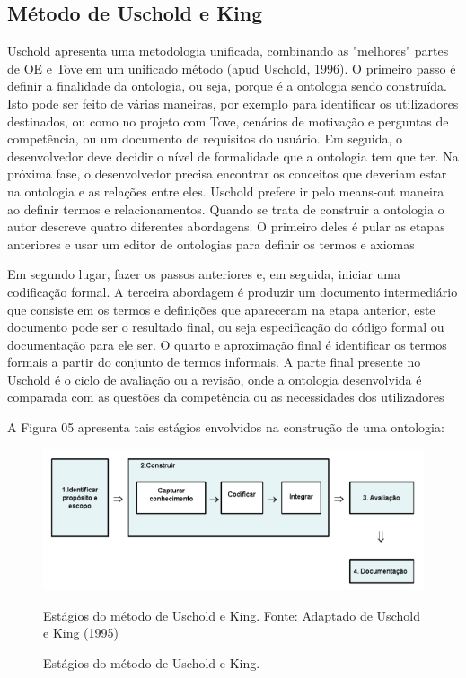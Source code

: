 \subsection{Método de Uschold e King} 
\qquad Uschold apresenta uma metodologia unificada, combinando as "melhores" partes de OE e Tove em um unificado método (apud Uschold, 1996). O primeiro passo é definir a finalidade da ontologia, ou seja, porque é a ontologia sendo construída. Isto pode ser feito de várias maneiras, por exemplo para identificar os utilizadores destinados, ou como no projeto com Tove, cenários de motivação e perguntas de competência, ou um documento de requisitos do usuário. Em seguida, o desenvolvedor deve decidir o nível de formalidade que a ontologia tem que ter. Na próxima fase, o desenvolvedor precisa encontrar os conceitos que deveriam estar na ontologia e as relações entre eles. Uschold prefere ir pelo means-out maneira ao definir termos e relacionamentos. Quando se trata de construir a ontologia o autor descreve quatro diferentes abordagens. O primeiro deles é pular as etapas anteriores e usar um editor de ontologias para definir os termos e axiomas %

Em segundo lugar, fazer os passos anteriores e, em seguida, iniciar uma codificação formal. A terceira abordagem é produzir um documento intermediário que consiste em os termos e definições que apareceram na etapa anterior, este documento pode ser o resultado final, ou seja especificação do código formal ou documentação para ele ser. O quarto e aproximação final é identificar os termos formais a partir do conjunto de termos informais. A parte final presente no Uschold é o ciclo de avaliação ou a revisão, onde a ontologia desenvolvida é comparada com as questões da competência ou as necessidades dos utilizadores %

A Figura 05 apresenta tais estágios envolvidos na construção de uma ontologia:

\begin{figure}[h] 
\centering %
\includegraphics[scale=0.5]{Figuras/5.png} %
\caption{Estágios do método de Uschold e King.
Fonte: Adaptado de Uschold e King (1995)}
\caption[Estágios do método de Uschold e King]{Estágios do método de Uschold e King. %
}
\end{figure}

